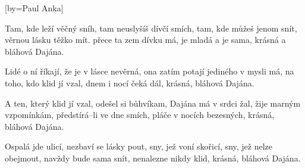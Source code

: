 [by={Paul Anka}]

\beginverse{}
Tam, kde leží věčný sníh, tam neuslyšíš dívčí smích,
tam, kde můžeš jenom snít, věrnou lásku těžko mít.
přece ta zem dívku má, je mladá a je sama,
krásná a bláhová Dajána.   
\endverse{}

\beginverse{}
Lidé o ní říkají, že je v lásce nevěrná,
ona zatím potají jediného v mysli má,
na toho, kdo klid jí vzal, dnem i nocí čeká dál,
krásná, bláhová Dajána.   
\endverse{}

\beginverse{}
A ten, který klid jí vzal, odešel si bůhvíkam,
Dajána má v srdci žal, žije marným vzpomínkám,
předstírá--li ve dne smích, pláče v nocích bezesných,
krásná, bláhová Dajána.   
\endverse{}

\beginverse{}
Ospalá jde ulicí, nezbaví se lásky pout,
sny, jež voní skořicí, sny, jež nelze obejmout,
navždy bude sama snít, nenalezne nikdy klid,
krásná, bláhová Dajána.   
\endverse{}

\endsong{}
